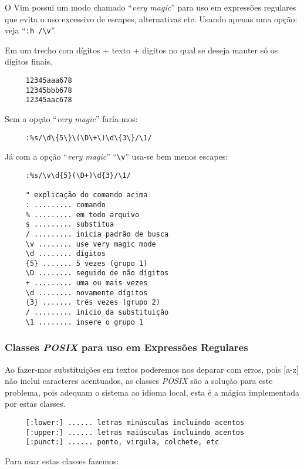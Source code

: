 O Vim possui um modo chamado ``{\em very magic}'' para uso em expressões
regulares que evita o uso excessivo de escapes, alternativas etc. Usando apenas
uma opção: veja ``\verb+:h /\v+''.

Em um trecho com dígitos + texto + digitos
no qual se deseja manter só os dígitos finais.

\begin{verbatim}
     12345aaa678
     12345bbb678
     12345aac678
\end{verbatim}

Sem a opção ``{\em very magic}'' faría-mos:
    
\begin{verbatim}
     :%s/\d\{5\}\(\D\+\)\d\{3\}/\1/
\end{verbatim}

Já com a opção ``{\em very magic}'' ``\verb+\v+'' usa-se bem menos escapes:
    
\begin{verbatim}
     :%s/\v\d{5}(\D+)\d{3}/\1/

     " explicação do comando acima
     : ......... comando
     % ......... em todo arquivo
     s ......... substitua
     / ......... inicia padrão de busca
     \v ........ use very magic mode
     \d ........ dígitos
     {5} ....... 5 vezes (grupo 1)
     \D ........ seguido de não dígitos
     + ......... uma ou mais vezes
     \d ........ novamente dígitos
     {3} ....... três vezes (grupo 2)
     / ......... inicio da substituição
     \1 ........ insere o grupo 1
\end{verbatim}               

\subsubsection{Classes {\em POSIX} para uso em Expressões Regulares}

Ao fazer-mos substituições em textos poderemos nos deparar com
erros, pois [a-z] não inclui caracteres acentuados, as classes
{\em POSIX} são a solução para este problema, pois adequam o 
sistema ao idioma local, esta é a mágica implementada por estas classes.

\begin{verbatim}
     [:lower:] ...... letras minúsculas incluindo acentos
     [:upper:] ...... letras maiúsculas incluindo acentos
     [:punct:] ...... ponto, virgula, colchete, etc
\end{verbatim}

Para usar estas classes fazemos:

